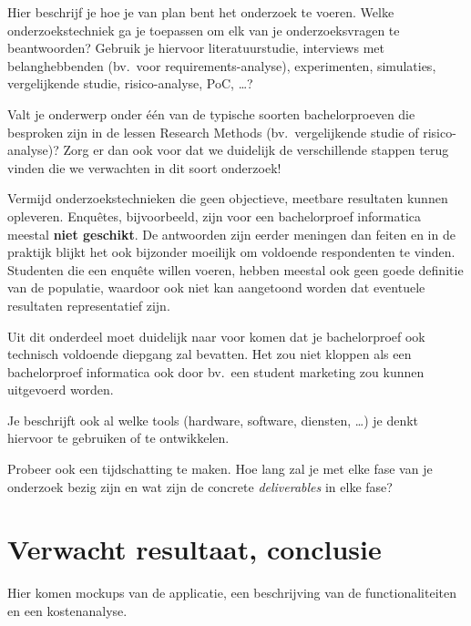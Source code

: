 Hier beschrijf je hoe je van plan bent het onderzoek te voeren. Welke onderzoekstechniek ga je toepassen om elk van je onderzoeksvragen te beantwoorden? Gebruik je hiervoor literatuurstudie, interviews met belanghebbenden (bv.~voor requirements-analyse), experimenten, simulaties, vergelijkende studie, risico-analyse, PoC, \ldots?

Valt je onderwerp onder één van de typische soorten bachelorproeven die besproken zijn in de lessen Research Methods (bv.\ vergelijkende studie of risico-analyse)? Zorg er dan ook voor dat we duidelijk de verschillende stappen terug vinden die we verwachten in dit soort onderzoek!

Vermijd onderzoekstechnieken die geen objectieve, meetbare resultaten kunnen opleveren. Enquêtes, bijvoorbeeld, zijn voor een bachelorproef informatica meestal \textbf{niet geschikt}. De antwoorden zijn eerder meningen dan feiten en in de praktijk blijkt het ook bijzonder moeilijk om voldoende respondenten te vinden. Studenten die een enquête willen voeren, hebben meestal ook geen goede definitie van de populatie, waardoor ook niet kan aangetoond worden dat eventuele resultaten representatief zijn.

Uit dit onderdeel moet duidelijk naar voor komen dat je bachelorproef ook technisch voldoen\-de diepgang zal bevatten. Het zou niet kloppen als een bachelorproef informatica ook door bv.\ een student marketing zou kunnen uitgevoerd worden.

Je beschrijft ook al welke tools (hardware, software, diensten, \ldots) je denkt hiervoor te gebruiken of te ontwikkelen.

Probeer ook een tijdschatting te maken. Hoe lang zal je met elke fase van je onderzoek bezig zijn en wat zijn de concrete \emph{deliverables} in elke fase?

\section{Verwacht resultaat, conclusie}%
\label{sec:verwachte_resultaten}

Hier komen mockups van de applicatie, een beschrijving van de functionaliteiten en een kostenanalyse.

